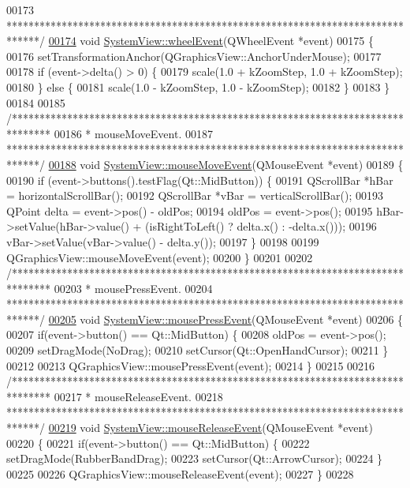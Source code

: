 \begin{DoxyCode}
00173 \textcolor{comment}{ ******************************************************************************/}
\hypertarget{systemview_8cpp_source_l00174}{}\hyperlink{group___graphics_gaab2fa6cebf9022eb6bf31497c0789675}{00174} \textcolor{keywordtype}{void} \hyperlink{group___graphics_gaab2fa6cebf9022eb6bf31497c0789675}{SystemView::wheelEvent}(QWheelEvent *event)
00175 \{
00176   setTransformationAnchor(QGraphicsView::AnchorUnderMouse);
00177 
00178   \textcolor{keywordflow}{if} (event->delta() > 0) \{
00179     scale(1.0 + kZoomStep, 1.0 + kZoomStep);
00180   \} \textcolor{keywordflow}{else} \{
00181     scale(1.0 - kZoomStep, 1.0 - kZoomStep);
00182   \}
00183 \}
00184 
00185 \textcolor{comment}{/*******************************************************************************}
00186 \textcolor{comment}{ * mouseMoveEvent.}
00187 \textcolor{comment}{ ******************************************************************************/}
\hypertarget{systemview_8cpp_source_l00188}{}\hyperlink{group___graphics_gab19e233cd697852dd71140971cb6e122}{00188} \textcolor{keywordtype}{void} \hyperlink{group___graphics_gab19e233cd697852dd71140971cb6e122}{SystemView::mouseMoveEvent}(QMouseEvent *event)
00189 \{
00190   \textcolor{keywordflow}{if} (event->buttons().testFlag(Qt::MidButton)) \{
00191     QScrollBar *hBar = horizontalScrollBar();
00192     QScrollBar *vBar = verticalScrollBar();
00193     QPoint delta = \textcolor{keyword}{event}->pos() - oldPos;
00194     oldPos = \textcolor{keyword}{event}->pos();
00195     hBar->setValue(hBar->value() + (isRightToLeft() ? delta.x() : -delta.x()));
00196     vBar->setValue(vBar->value() - delta.y());
00197   \}
00198 
00199   QGraphicsView::mouseMoveEvent(event);
00200 \}
00201 
00202 \textcolor{comment}{/*******************************************************************************}
00203 \textcolor{comment}{ * mousePressEvent.}
00204 \textcolor{comment}{ ******************************************************************************/}
\hypertarget{systemview_8cpp_source_l00205}{}\hyperlink{group___graphics_ga42d4a485d6d9bd891d9505a5213cf783}{00205} \textcolor{keywordtype}{void} \hyperlink{group___graphics_ga42d4a485d6d9bd891d9505a5213cf783}{SystemView::mousePressEvent}(QMouseEvent *event)
00206 \{
00207   \textcolor{keywordflow}{if}(event->button() == Qt::MidButton) \{
00208     oldPos = \textcolor{keyword}{event}->pos();
00209     setDragMode(NoDrag);
00210     setCursor(Qt::OpenHandCursor);
00211   \}
00212 
00213   QGraphicsView::mousePressEvent(event);
00214 \}
00215 
00216 \textcolor{comment}{/*******************************************************************************}
00217 \textcolor{comment}{ * mouseReleaseEvent.}
00218 \textcolor{comment}{ ******************************************************************************/}
\hypertarget{systemview_8cpp_source_l00219}{}\hyperlink{group___graphics_gaa8a2664405194bbe29daa454aead7416}{00219} \textcolor{keywordtype}{void} \hyperlink{group___graphics_gaa8a2664405194bbe29daa454aead7416}{SystemView::mouseReleaseEvent}(QMouseEvent *event)
00220 \{
00221   \textcolor{keywordflow}{if}(event->button() == Qt::MidButton) \{
00222     setDragMode(RubberBandDrag);
00223     setCursor(Qt::ArrowCursor);
00224   \}
00225 
00226   QGraphicsView::mouseReleaseEvent(event);
00227 \}
00228 
\end{DoxyCode}
